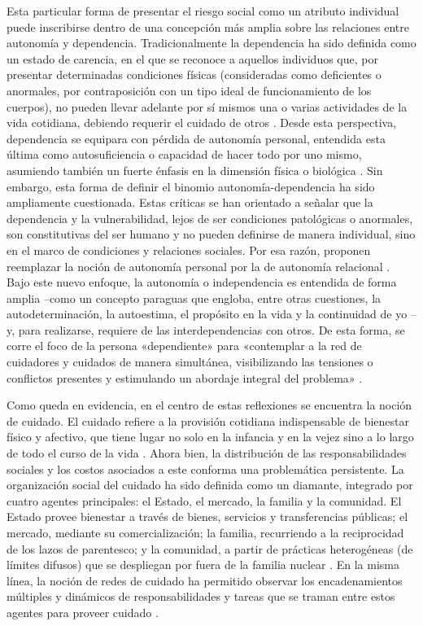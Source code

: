 \begin{refsection}
Esta particular forma de presentar el riesgo social como un atributo individual puede inscribirse dentro de una concepción más amplia sobre las relaciones entre autonomía y dependencia. Tradicionalmente la dependencia ha sido definida como un estado de carencia, en el que se reconoce a aquellos individuos que, por presentar determinadas condiciones físicas (consideradas como deficientes o anormales, por contraposición con un tipo ideal de funcionamiento de los cuerpos), no pueden llevar adelante por sí mismos una o varias actividades de la vida cotidiana, debiendo requerir el cuidado de otros \protect\parencite{4207-AGUIRRECUNS2018}. Desde esta perspectiva, dependencia se equipara con pérdida de autonomía personal, entendida esta última como autosuficiencia o capacidad de hacer todo por uno mismo, asumiendo también un fuerte énfasis en la dimensión física o biológica \protect\parencite{4169-CERRI2016}. Sin embargo, esta forma de definir el binomio autonomía-dependencia ha sido ampliamente cuestionada. Estas críticas se han orientado a señalar que la dependencia y la vulnerabilidad, lejos de ser condiciones patológicas o anormales, son constitutivas del ser humano y no pueden definirse de manera individual, sino en el marco de condiciones y relaciones sociales. Por esa razón, proponen reemplazar la noción de autonomía personal por la de autonomía relacional \protect\parencite{4169-CERRI2016}. Bajo este nuevo enfoque, la autonomía o independencia es entendida de forma amplia –como un concepto paraguas que engloba, entre otras cuestiones, la autodeterminación, la autoestima, el propósito en la vida y la continuidad de yo \protect\parencite{4203-SMITH2007}– y, para realizarse, requiere de las interdependencias con otros. De esta forma, se corre el foco de la persona «dependiente» para «contemplar a la red de cuidadores y cuidados de manera simultánea, visibilizando las tensiones o conflictos presentes y estimulando un abordaje integral del problema» \protect\parencite[pág.~146]{4207-AGUIRRECUNS2018}.

Como queda en evidencia, en el centro de estas reflexiones se encuentra la noción de cuidado. El cuidado refiere a la provisión cotidiana indispensable de bienestar físico y afectivo, que tiene lugar no solo en la infancia y en la vejez sino a lo largo de todo el curso de la vida \protect\parencite{4174-BATTHYANY2021}. Ahora bien, la distribución de las responsabilidades sociales y los costos asociados a este conforma una problemática persistente. La organización social del cuidado ha sido definida como un diamante, integrado por cuatro agentes principales: el Estado, el mercado, la familia y la comunidad. El Estado provee bienestar a través de bienes, servicios y transferencias públicas; el mercado, mediante su comercialización; la familia, recurriendo a la reciprocidad de los lazos de parentesco; y la comunidad, a partir de prácticas heterogéneas (de límites difusos) que se despliegan por fuera de la familia nuclear \protect\parencite{4204-VEGASOLIS2017}. En la misma línea, la noción de redes de cuidado ha permitido observar los encadenamientos múltiples y dinámicos de responsabilidades y tareas que se traman entre estos agentes para proveer cuidado \protect\parencite{4174-BATTHYANY2021}.


\end{refsection}
